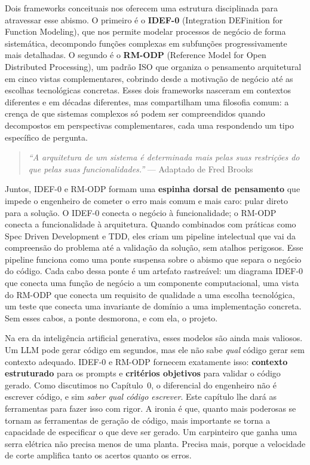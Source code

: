 Dois frameworks conceituais nos oferecem uma estrutura disciplinada para atravessar
esse abismo. O primeiro é o \textbf{IDEF-0} (Integration DEFinition for Function
Modeling), que nos permite modelar processos de negócio de forma sistemática,
decompondo funções complexas em subfunções progressivamente mais detalhadas. O
segundo é o \textbf{RM-ODP} (Reference Model for Open Distributed Processing),
um padrão ISO que organiza o pensamento arquitetural em cinco vistas
complementares, cobrindo desde a motivação de negócio até as escolhas tecnológicas
concretas. Esses dois frameworks nasceram em contextos diferentes e em décadas
diferentes, mas compartilham uma filosofia comum: a crença de que sistemas
complexos só podem ser compreendidos quando decompostos em perspectivas
complementares, cada uma respondendo um tipo específico de pergunta.

\begin{quote}
\textit{``A arquitetura de um sistema é determinada mais pelas suas restrições do que pelas suas funcionalidades.''} --- Adaptado de Fred Brooks
\end{quote}

Juntos, IDEF-0 e RM-ODP formam uma \textbf{espinha dorsal de pensamento} que
impede o engenheiro de cometer o erro mais comum e mais caro: pular direto para a
solução. O IDEF-0 conecta o negócio à funcionalidade; o RM-ODP conecta a
funcionalidade à arquitetura. Quando combinados com práticas como Spec Driven
Development e TDD, eles criam um pipeline intelectual que vai da compreensão do
problema até a validação da solução, sem atalhos perigosos. Esse pipeline funciona
como uma ponte suspensa sobre o abismo que separa o negócio do código. Cada cabo
dessa ponte é um artefato rastreável: um diagrama IDEF-0 que conecta uma função
de negócio a um componente computacional, uma vista do RM-ODP que conecta um
requisito de qualidade a uma escolha tecnológica, um teste que conecta uma
invariante de domínio a uma implementação concreta. Sem esses cabos, a ponte
desmorona, e com ela, o projeto.

Na era da inteligência artificial generativa, esses modelos são ainda mais
valiosos. Um LLM pode gerar código em segundos, mas ele não sabe \emph{qual}
código gerar sem contexto adequado. IDEF-0 e RM-ODP fornecem exatamente isso:
\textbf{contexto estruturado} para os prompts e \textbf{critérios objetivos}
para validar o código gerado. Como discutimos no Capítulo~0, o diferencial do
engenheiro não é escrever código, e sim \emph{saber qual código escrever}. Este
capítulo lhe dará as ferramentas para fazer isso com rigor. A ironia é que, quanto
mais poderosas se tornam as ferramentas de geração de código, mais importante se
torna a capacidade de especificar o que deve ser gerado. Um carpinteiro que ganha
uma serra elétrica não precisa menos de uma planta. Precisa mais, porque a
velocidade de corte amplifica tanto os acertos quanto os erros.

